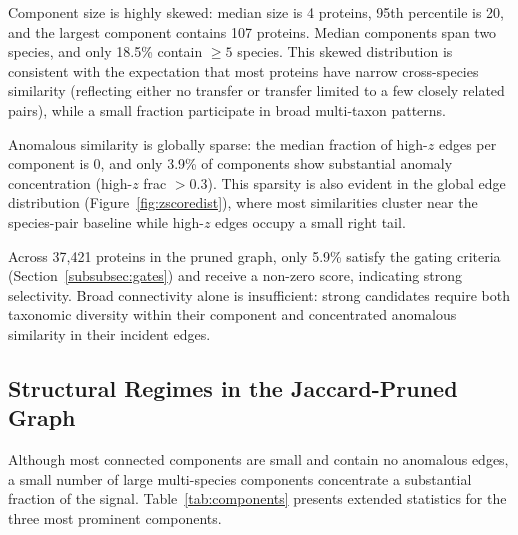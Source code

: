 \documentclass[11pt]{article}
\begin{document}
Component size is highly skewed: median size is 4 proteins, 95th percentile is 20, and the largest component contains 107 proteins. Median components span two species, and only 18.5\% contain $\ge 5$ species. This skewed distribution is consistent with the expectation that most proteins have narrow cross-species similarity (reflecting either no transfer or transfer limited to a few closely related pairs), while a small fraction participate in broad multi-taxon patterns.

Anomalous similarity is globally sparse: the median fraction of high-$z$ edges per component is 0, and only 3.9\% of components show substantial anomaly concentration (high-$z$ frac $> 0.3$). This sparsity is also evident in the global edge distribution (Figure~\ref{fig:zscoredist}), where most similarities cluster near the species-pair baseline while high-$z$ edges occupy a small right tail.

Across 37,421 proteins in the pruned graph, only 5.9\% satisfy the gating criteria (Section~\ref{subsubsec:gates}) and receive a non-zero score, indicating strong selectivity. Broad connectivity alone is insufficient: strong candidates require both taxonomic diversity within their component and concentrated anomalous similarity in their incident edges.

\subsection{Structural Regimes in the Jaccard-Pruned Graph}

Although most connected components are small and contain no anomalous edges, a small number of large multi-species components concentrate a substantial fraction of the signal. Table~\ref{tab:components} presents extended statistics for the three most prominent components.
\end{document}
